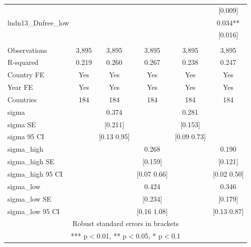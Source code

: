 \begin{tabular}{lccccc}
 &  &  &  &  & [0.009] \\
lndn13\_Dnfree\_low &  &  &  &  & 0.034** \\
 &  &  &  &  & [0.016] \\
 &  &  &  &  &  \\
Observations & 3,895 & 3,895 & 3,895 & 3,895 & 3,895 \\
R-squared & 0.219 & 0.260 & 0.267 & 0.238 & 0.247 \\
Country FE & Yes & Yes & Yes & Yes & Yes \\
Year FE & Yes & Yes & Yes & Yes & Yes \\
Countries & 184 & 184 & 184 & 184 & 184 \\
sigma &  & 0.374 &  & 0.281 &  \\
sigma SE &  & [0.211] &  & [0.153] &  \\
sigma 95 CI &  & [0.13 0.95] &  & [0.09 0.73] &  \\
sigma\_high &  &  & 0.268 &  & 0.190 \\
sigma\_high SE &  &  & [0.159] &  & [0.121] \\
sigma\_high 95 CI &  &  & [0.07 0.66] &  & [0.02 0.50] \\
sigma\_low &  &  & 0.424 &  & 0.346 \\
sigma\_low SE &  &  & [0.234] &  & [0.179] \\
 sigma\_low 95 CI &  &  & [0.16 1.08] &  & [0.13 0.87] \\ \hline
\multicolumn{6}{c}{ Robust standard errors in brackets} \\
\multicolumn{6}{c}{ *** p$<$0.01, ** p$<$0.05, * p$<$0.1} \\
\end{tabular}
